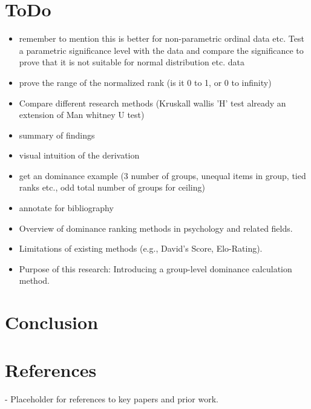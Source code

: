 \documentclass[12pt]{article}
\begin{document}
		\section{ToDo}
		\begin{itemize}
			\item remember to mention this is better for non-parametric ordinal data etc. Test a parametric significance level with the data and compare the significance to prove that it is not suitable for normal distribution etc. data
			\item prove the range of the normalized rank (is it 0 to 1, or 0 to infinity)
			\item Compare different research methods (Kruskall wallis 'H' test already an extension of Man whitney U test)
			\item summary of findings
			\item visual intuition of the derivation
			\item get an dominance example (3 number of groups, unequal items in group, tied ranks etc., odd total number of groups for ceiling)
			\item annotate for bibliography
                \item Overview of dominance ranking methods in psychology and related fields.
    \item Limitations of existing methods (e.g., David's Score, Elo-Rating).
    \item Purpose of this research: Introducing a group-level dominance calculation method.
		\end{itemize}
		
		
		\section{Conclusion}
		
		
		
		\section*{References}
		- Placeholder for references to key papers and prior work.
		
	
\end{document}
